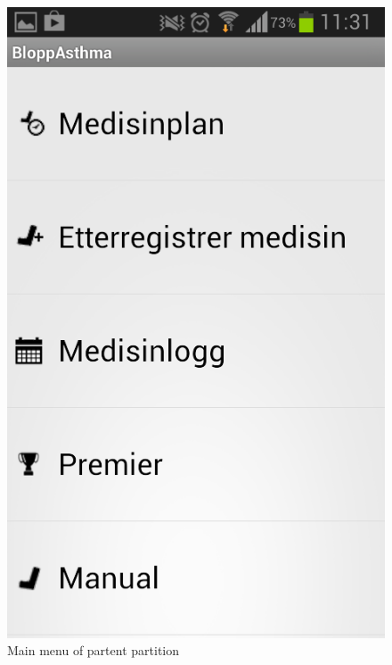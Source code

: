 \begin{figure}
	\begin{minipage}[t]{0.4\linewidth}
		\centering
			\includegraphics[width=0.20\paperwidth]{Pictures/new-screenshots/parent-menu.png}
		\caption{Main menu of partent partition}
		\label{fig:parent_main_menu}
	\end{minipage}
	\hspace{3cm}
	\begin{minipage}[t]{0.4\linewidth}
		\centering

\end{minipage}
\end{figure}
